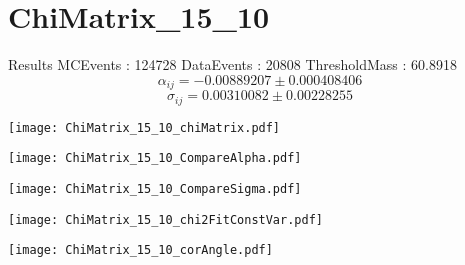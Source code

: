 \documentclass[a4paper,12pt]{article}
\begin{document}
\section{ChiMatrix\_15\_10}
\begin{minipage}{0.49\linewidth} Results \newline
MCEvents : 124728\newline
DataEvents : 20808 \newline
ThresholdMass : 60.8918\\
$$\alpha_{ij} = -0.00889207\pm 0.000408406$$
$$\sigma_{ij} = 0.00310082\pm 0.00228255$$
\end{minipage}\hfill
\begin{minipage}{0.49\linewidth} 
\texttt{[image: ChiMatrix\_15\_10\_chiMatrix.pdf]}\\
\end{minipage}
\hfill
\begin{minipage}{0.49\linewidth} 
\texttt{[image: ChiMatrix\_15\_10\_CompareAlpha.pdf]}\\
\end{minipage}
\hfill
\begin{minipage}{0.49\linewidth} 
\texttt{[image: ChiMatrix\_15\_10\_CompareSigma.pdf]}\\
\end{minipage}
\begin{minipage}{0.49\linewidth} 
\texttt{[image: ChiMatrix\_15\_10\_chi2FitConstVar.pdf]}\\
\end{minipage}
\hfill
\begin{minipage}{0.49\linewidth} 
\texttt{[image: ChiMatrix\_15\_10\_corAngle.pdf]}\\
\end{minipage}
\end{document}
